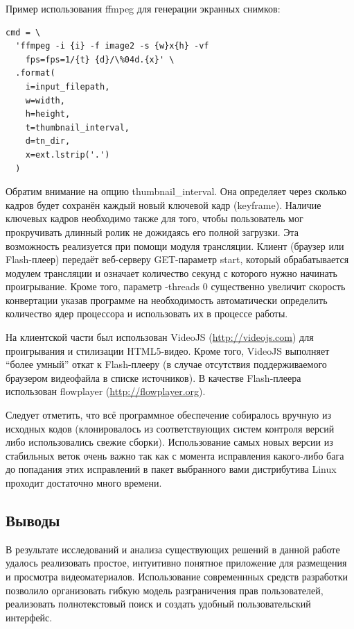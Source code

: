 \FloatBarrier

Пример использования ffmpeg для генерации экранных снимков:
\begin{verbatim}
cmd = \
  'ffmpeg -i {i} -f image2 -s {w}x{h} -vf
    fps=fps=1/{t} {d}/\%04d.{x}' \
  .format(
    i=input_filepath,
    w=width,
    h=height,
    t=thumbnail_interval,
    d=tn_dir,
    x=ext.lstrip('.')
  )
\end{verbatim}

Обратим внимание на опцию thumbnail\_interval. Она определяет через сколько кадров будет сохранён каждый новый
ключевой кадр (keyframe). Наличие ключевых кадров необходимо также для того, чтобы пользователь мог прокручивать
длинный ролик не дожидаясь его полной загрузки. Эта возможность реализуется при помощи модуля трансляции.
Клиент (браузер или Flash-плеер) передаёт веб-серверу GET-параметр start, который обрабатывается модулем трансляции
и означает количество секунд с которого нужно начинать проигрывание. Кроме того, параметр -threads 0 существенно
увеличит скорость конвертации указав программе на необходимость автоматически определить количество ядер
процессора и использовать их в процессе работы.

На клиентской части был использован VideoJS (\url{http://videojs.com}) для проигрывания и стилизации HTML5-видео.
Кроме того, VideoJS выполняет “более умный” откат к Flash-плееру (в случае отсутствия поддерживаемого браузером видеофайла
в списке источников). В качестве Flash-плеера использован flowplayer (\url{http://flowplayer.org}).

Следует отметить, что всё программное обеспечение собиралось вручную из исходных кодов (клонировалось из соответствующих
систем контроля версий либо использовались свежие сборки). Использование самых новых версии из стабильных веток очень важно
так как с момента исправления какого-либо бага до попадания этих исправлений в пакет выбранного вами дистрибутива Linux
проходит достаточно много времени.

\subsection{Выводы}

В результате исследований и анализа существующих решений в данной работе удалось
реализовать простое, интуитивно понятное приложение для размещения и просмотра
видеоматериалов. Использование современнных средств разработки позволило организовать
гибкую модель разграничения прав пользователей, реализовать полнотекстовый поиск и
создать удобный пользовательский интерфейс.
